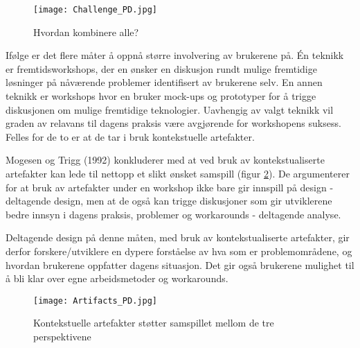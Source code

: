 \begin{figure}[H]
\centering
\texttt{[image: Challenge\_PD.jpg]}
\caption{Hvordan kombinere alle?}
\label{Challenge_PD}
\end{figure}

\noindent
Ifølge \cite{Mogensen92} er det flere måter å oppnå større involvering av brukerene på. Én teknikk er fremtidsworkshops, der en ønsker en diskusjon rundt mulige fremtidige løsninger på nåværende problemer identifisert av brukerene selv. En annen teknikk er workshops hvor en bruker mock-ups og prototyper for å trigge diskusjonen om mulige fremtidige teknologier.  Uavhengig av valgt teknikk vil graden av relavans til dagens praksis være avgjørende for workshopens suksess. Felles for de to er at de tar i bruk kontekstuelle artefakter.

\noindent
Mogesen og Trigg (1992) konkluderer med at ved bruk av kontekstualiserte artefakter kan lede til nettopp et slikt ønsket samspill (figur \ref{Artifacts_PD}). De argumenterer for at bruk av artefakter under en workshop ikke bare gir innspill på design - deltagende design, men at de også kan trigge diskusjoner som gir utviklerene bedre innsyn i dagens praksis, problemer og workarounds - deltagende analyse. 

\noindent
Deltagende design på denne måten, med bruk av kontekstualiserte artefakter, gir derfor forskere/utviklere en dypere forståelse av hva som er problemområdene, og hvordan brukerene oppfatter dagens situasjon. Det gir også brukerene mulighet til å bli klar over egne arbeidsmetoder og workarounds.

\begin{figure}[H]
\centering
\texttt{[image: Artifacts\_PD.jpg]}
\caption{Kontekstuelle artefakter støtter samspillet mellom de tre perspektivene}
\label{Artifacts_PD}
\end{figure}